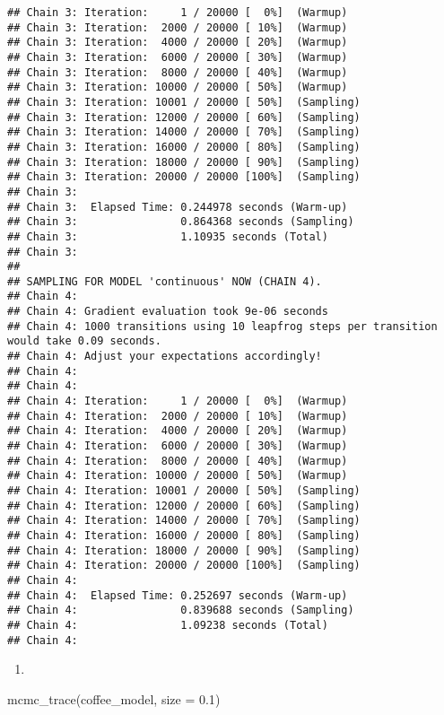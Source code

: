 \documentclass[
]{article}
\newenvironment{Shaded}{\begin{snugshade}}{\end{snugshade}}
\newcommand{\AttributeTok}[1]{\textcolor[rgb]{0.77,0.63,0.00}{#1}}
\newcommand{\FloatTok}[1]{\textcolor[rgb]{0.00,0.00,0.81}{#1}}
\newcommand{\FunctionTok}[1]{\textcolor[rgb]{0.00,0.00,0.00}{#1}}
\newcommand{\NormalTok}[1]{#1}
\providecommand{\tightlist}{%
  \setlength{\itemsep}{0pt}\setlength{\parskip}{0pt}}
\begin{document}
\begin{verbatim}
## Chain 3: Iteration:     1 / 20000 [  0%]  (Warmup)
## Chain 3: Iteration:  2000 / 20000 [ 10%]  (Warmup)
## Chain 3: Iteration:  4000 / 20000 [ 20%]  (Warmup)
## Chain 3: Iteration:  6000 / 20000 [ 30%]  (Warmup)
## Chain 3: Iteration:  8000 / 20000 [ 40%]  (Warmup)
## Chain 3: Iteration: 10000 / 20000 [ 50%]  (Warmup)
## Chain 3: Iteration: 10001 / 20000 [ 50%]  (Sampling)
## Chain 3: Iteration: 12000 / 20000 [ 60%]  (Sampling)
## Chain 3: Iteration: 14000 / 20000 [ 70%]  (Sampling)
## Chain 3: Iteration: 16000 / 20000 [ 80%]  (Sampling)
## Chain 3: Iteration: 18000 / 20000 [ 90%]  (Sampling)
## Chain 3: Iteration: 20000 / 20000 [100%]  (Sampling)
## Chain 3: 
## Chain 3:  Elapsed Time: 0.244978 seconds (Warm-up)
## Chain 3:                0.864368 seconds (Sampling)
## Chain 3:                1.10935 seconds (Total)
## Chain 3: 
## 
## SAMPLING FOR MODEL 'continuous' NOW (CHAIN 4).
## Chain 4: 
## Chain 4: Gradient evaluation took 9e-06 seconds
## Chain 4: 1000 transitions using 10 leapfrog steps per transition would take 0.09 seconds.
## Chain 4: Adjust your expectations accordingly!
## Chain 4: 
## Chain 4: 
## Chain 4: Iteration:     1 / 20000 [  0%]  (Warmup)
## Chain 4: Iteration:  2000 / 20000 [ 10%]  (Warmup)
## Chain 4: Iteration:  4000 / 20000 [ 20%]  (Warmup)
## Chain 4: Iteration:  6000 / 20000 [ 30%]  (Warmup)
## Chain 4: Iteration:  8000 / 20000 [ 40%]  (Warmup)
## Chain 4: Iteration: 10000 / 20000 [ 50%]  (Warmup)
## Chain 4: Iteration: 10001 / 20000 [ 50%]  (Sampling)
## Chain 4: Iteration: 12000 / 20000 [ 60%]  (Sampling)
## Chain 4: Iteration: 14000 / 20000 [ 70%]  (Sampling)
## Chain 4: Iteration: 16000 / 20000 [ 80%]  (Sampling)
## Chain 4: Iteration: 18000 / 20000 [ 90%]  (Sampling)
## Chain 4: Iteration: 20000 / 20000 [100%]  (Sampling)
## Chain 4: 
## Chain 4:  Elapsed Time: 0.252697 seconds (Warm-up)
## Chain 4:                0.839688 seconds (Sampling)
## Chain 4:                1.09238 seconds (Total)
## Chain 4:
\end{verbatim}

\begin{enumerate}
\def\labelenumi{\alph{enumi}.}
\setcounter{enumi}{2}
\tightlist
\item
\end{enumerate}

\begin{Shaded}
\begin{Highlighting}[]
\FunctionTok{mcmc\_trace}\NormalTok{(coffee\_model, }\AttributeTok{size =} \FloatTok{0.1}\NormalTok{)}
\end{Highlighting}
\end{Shaded}
\end{document}

